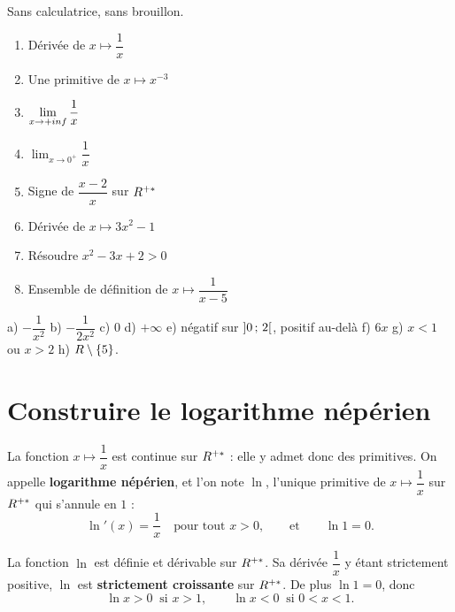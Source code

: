\begin{automatismes}
Sans calculatrice, sans brouillon.

\begin{enumerate}[label=\textbf{\alph*)}, leftmargin=*, itemsep=0.25em]
  \item Dérivée de $x \mapsto \dfrac{1}{x}$
  \item Une primitive de $x \mapsto x^{-3}$
  \item $\limpinf \dfrac{1}{x}$
  \item $\displaystyle\lim_{x \to 0^{+}} \dfrac{1}{x}$
  \item Signe de $\dfrac{x-2}{x}$ sur $R^{+*}$
  \item Dérivée de $x \mapsto 3x^{2}-1$
  \item Résoudre $x^{2}-3x+2 > 0$
  \item Ensemble de définition de $x \mapsto \dfrac{1}{x-5}$
\end{enumerate}
\end{automatismes}

\begin{corrige}[automatismes]
a) $-\dfrac{1}{x^{2}}$ \quad b) $-\dfrac{1}{2x^{2}}$ \quad c) $0$ \quad
d) $+\infty$ \quad e) négatif sur $\left]0\,;\,2\right[$, positif au-delà \quad
f) $6x$ \quad g) $x<1$ ou $x>2$ \quad h) $R \setminus \{5\}$.
\end{corrige}

\section{Construire le logarithme népérien}

\begin{definition}
La fonction $x \mapsto \dfrac{1}{x}$ est continue sur $R^{+*}$ : elle y admet
donc des primitives. On appelle \textbf{logarithme népérien}, et l'on note
$\ln$, l'unique primitive de $x \mapsto \dfrac{1}{x}$ sur $R^{+*}$ qui s'annule
en $1$ :
\[
  \ln'(x) = \frac{1}{x} \quad \text{pour tout } x>0,
  \qquad \text{et} \qquad \ln 1 = 0 .
\]
\end{definition}

\begin{propriete}
La fonction $\ln$ est définie et dérivable sur $R^{+*}$. Sa dérivée
$\dfrac{1}{x}$ y étant strictement positive, $\ln$ est \textbf{strictement
croissante} sur $R^{+*}$. De plus $\ln 1 = 0$, donc
\[
  \ln x > 0 \ \text{ si } x>1, \qquad \ln x < 0 \ \text{ si } 0<x<1 .
\]
\end{propriete}

